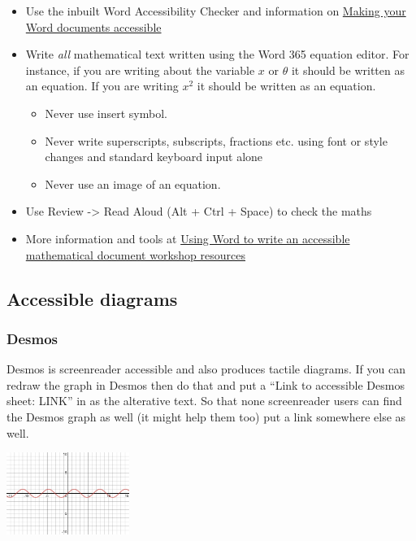 \documentclass[
  17pt,
  english,
  a4paper]{extarticle}
\providecommand{\tightlist}{%
  \setlength{\itemsep}{0pt}\setlength{\parskip}{0pt}}
\theoremstyle{plain}
\theoremstyle{plain}
\theoremstyle{plain}
\theoremstyle{plain}
\theoremstyle{plain}
\theoremstyle{definition}
\theoremstyle{definition}
\theoremstyle{definition}
\theoremstyle{remark}
\renewcommand{\;}{\,}
\begin{document}
\begin{itemize}
\item
  Use the inbuilt Word Accessibility Checker and information on \href{https://support.office.com/en-gb/article/make-your-word-documents-accessible-to-people-with-disabilities-d9bf3683-87ac-47ea-b91a-78dcacb3c66d}{Making your Word documents accessible}
\item
  Write \emph{all} mathematical text written using the Word 365 equation editor. For instance, if you are writing about the variable \(x\) or \(\theta\) it should be written as an equation. If you are writing \(x^2\) it should be written as an equation.

  \begin{itemize}
  \tightlist
  \item
    Never use insert symbol.
  \item
    Never write superscripts, subscripts, fractions etc. using font or style changes and standard keyboard input alone
  \item
    Never use an image of an equation.
  \end{itemize}
\item
  Use Review -\textgreater{} Read Aloud (Alt + Ctrl + Space) to check the maths
\item
  More information and tools at \href{https://stem-enable.github.io/WordWorkshop/}{Using Word to write an accessible mathematical document workshop resources}
\end{itemize}

\hypertarget{accessible-diagrams}{%
\subsection{Accessible diagrams}\label{accessible-diagrams}}

\hypertarget{desmos}{%
\subsubsection{Desmos}\label{desmos}}

Desmos is screenreader accessible and also produces tactile diagrams. If you can redraw the graph in Desmos then do that and put a ``Link to accessible Desmos sheet: LINK'' in as the alterative text. So that none screenreader users can find the Desmos graph as well (it might help them too) put a link somewhere else as well.

\includegraphics[width=0.3\textwidth,height=\textheight]{./Figs/desmos-sine-graph}
\end{document}
